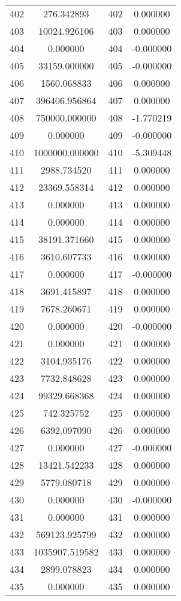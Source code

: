 \documentclass[12pt]{article}
\begin{document}
\begin{longtable}{@{}cccc@{}}
402 & 276.342893 & 402 & 0.000000 \\
403 & 10024.926106 & 403 & 0.000000 \\
404 & 0.000000 & 404 & -0.000000 \\
405 & 33159.000000 & 405 & -0.000000 \\
406 & 1560.068833 & 406 & 0.000000 \\
407 & 396406.956864 & 407 & 0.000000 \\
408 & 750000.000000 & 408 & -1.770219 \\
409 & 0.000000 & 409 & -0.000000 \\
410 & 1000000.000000 & 410 & -5.309448 \\
411 & 2988.734520 & 411 & 0.000000 \\
412 & 23369.558314 & 412 & 0.000000 \\
413 & 0.000000 & 413 & 0.000000 \\
414 & 0.000000 & 414 & 0.000000 \\
415 & 38191.371660 & 415 & 0.000000 \\
416 & 3610.607733 & 416 & 0.000000 \\
417 & 0.000000 & 417 & -0.000000 \\
418 & 3691.415897 & 418 & 0.000000 \\
419 & 7678.260671 & 419 & 0.000000 \\
420 & 0.000000 & 420 & -0.000000 \\
421 & 0.000000 & 421 & 0.000000 \\
422 & 3104.935176 & 422 & 0.000000 \\
423 & 7732.848628 & 423 & 0.000000 \\
424 & 99329.668368 & 424 & 0.000000 \\
425 & 742.325752 & 425 & 0.000000 \\
426 & 6392.097090 & 426 & 0.000000 \\
427 & 0.000000 & 427 & -0.000000 \\
428 & 13421.542233 & 428 & 0.000000 \\
429 & 5779.080718 & 429 & 0.000000 \\
430 & 0.000000 & 430 & -0.000000 \\
431 & 0.000000 & 431 & 0.000000 \\
432 & 569123.925799 & 432 & 0.000000 \\
433 & 1035907.519582 & 433 & 0.000000 \\
434 & 2899.078823 & 434 & 0.000000 \\
435 & 0.000000 & 435 & 0.000000 \\

\end{longtable}
\end{document}
